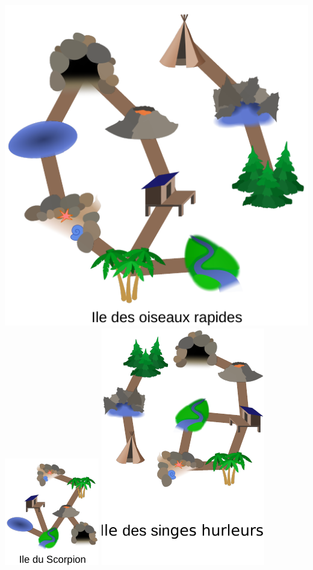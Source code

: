\documentclass[french, landscape]{article}
\begin{document}
\newpage\includegraphics[height=\textheight]{iles/svgs/verification_et-mod/oiseaux-rapides.pdf}
\newpage\includegraphics[height=\textheight]{iles/svgs/verification_et-mod/scorpion.pdf}
\newpage\includegraphics[height=\textheight]{iles/svgs/verification_et-mod/singes-hurleurs.pdf}
\end{document}
